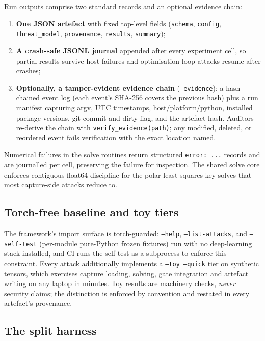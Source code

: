 \documentclass[11pt]{article}
\begin{document}
Run outputs comprise two standard records and an optional evidence chain:
\begin{enumerate}
\item \textbf{One JSON artefact} with fixed top-level fields
  (\texttt{schema}, \texttt{config}, \texttt{threat\_model},
  \texttt{provenance}, \texttt{results}, \texttt{summary});
\item \textbf{A crash-safe JSONL journal} appended after every experiment
  cell, so partial results survive host failures and optimisation-loop
  attacks resume after crashes;
\item \textbf{Optionally, a tamper-evident evidence chain}
  (\texttt{--evidence}): a hash-chained event log (each event's
  SHA-256 covers the previous hash) plus a run manifest capturing argv,
  UTC timestamps, host/platform/python, installed package versions, git
  commit and dirty flag, and the artefact hash. Auditors re-derive the
  chain with \texttt{verify\_evidence(path)}; any modified, deleted, or
  reordered event fails verification with the exact location named.
\end{enumerate}

Numerical failures in the solve routines return structured
\texttt{error:\ ...} records and are journalled per cell, preserving the
failure for inspection. The shared solve core enforces
contiguous-float64 discipline for the polar least-squares key solves that
most capture-side attacks reduce to.

\subsection{Torch-free baseline and toy tiers}

The framework's import surface is torch-guarded: \texttt{--help},
\texttt{--list-attacks}, and \texttt{--self-test} (per-module pure-Python
frozen fixtures) run with no deep-learning stack installed, and CI
runs the self-test as a subprocess to enforce this constraint. Every
attack additionally implements a \texttt{--toy --quick} tier on synthetic
tensors, which exercises capture loading, solving,
gate integration and artefact writing on any laptop in minutes. Toy results
are machinery checks, \emph{never} security claims; the distinction is
enforced by convention and restated in every artefact's provenance.

\subsection{The split harness}
\end{document}
